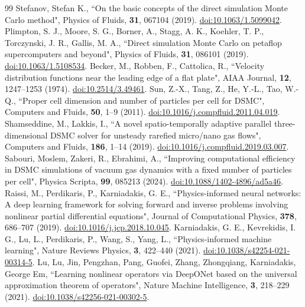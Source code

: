 \documentclass[aip,pof,preprint,notitlepage,floatfix,amsmath,amssymb]{revtex4-2}
\begin{document}
\begin{thebibliography}{99}
 Stefanov, Stefan K., ``On the basic concepts of the direct simulation Monte Carlo method", Physics of Fluids, \textbf{31}, 067104 (2019). \href{https://doi.org/10.1063/1.5099042}{doi:10.1063/1.5099042}.
 Plimpton, S. J., Moore, S. G., Borner, A., Stagg, A. K., Koehler, T. P., Torczynski, J. R., Gallis, M. A., ``Direct simulation Monte Carlo on petaflop supercomputers and beyond", Physics of Fluids, \textbf{31}, 086101 (2019). \href{https://doi.org/10.1063/1.5108534}{doi:10.1063/1.5108534}.
 Becker, M., Robben, F., Cattolica, R., ``Velocity distribution functions near the leading edge of a flat plate", AIAA Journal, \textbf{12}, 1247--1253 (1974). \href{https://doi.org/10.2514/3.49461}{doi:10.2514/3.49461}.
 Sun, Z.-X., Tang, Z., He, Y.-L., Tao, W.-Q., ``Proper cell dimension and number of particles per cell for DSMC", Computers and Fluids, \textbf{50}, 1--9 (2011). \href{https://doi.org/10.1016/j.compfluid.2011.04.019}{doi:10.1016/j.compfluid.2011.04.019}.
 Shamseddine, M., Lakkis, I., ``A novel spatio-temporally adaptive parallel three-dimensional DSMC solver for unsteady rarefied micro/nano gas flows", Computers and Fluids, \textbf{186}, 1--14 (2019). \href{https://doi.org/10.1016/j.compfluid.2019.03.007}{doi:10.1016/j.compfluid.2019.03.007}.
 Sabouri, Moslem, Zakeri, R., Ebrahimi, A., ``Improving computational efficiency in DSMC simulations of vacuum gas dynamics with a fixed number of particles per cell", Physica Scripta, \textbf{99}, 085213 (2024). \href{https://doi.org/10.1088/1402-4896/ad5a46}{doi:10.1088/1402-4896/ad5a46}.
 Raissi, M., Perdikaris, P., Karniadakis, G. E., ``Physics-informed neural networks: A deep learning framework for solving forward and inverse problems involving nonlinear partial differential equations", Journal of Computational Physics, \textbf{378}, 686--707 (2019). \href{https://doi.org/10.1016/j.jcp.2018.10.045}{doi:10.1016/j.jcp.2018.10.045}.
 Karniadakis, G. E., Kevrekidis, I. G., Lu, L., Perdikaris, P., Wang, S., Yang, L., ``Physics-informed machine learning", Nature Reviews Physics, \textbf{3}, 422--440 (2021). \href{https://doi.org/10.1038/s42254-021-00314-5}{doi:10.1038/s42254-021-00314-5}.
 Lu, Lu, Jin, Pengzhan, Pang, Guofei, Zhang, Zhongqiang, Karniadakis, George Em, ``Learning nonlinear operators via DeepONet based on the universal approximation theorem of operators", Nature Machine Intelligence, \textbf{3}, 218--229 (2021). \href{https://doi.org/10.1038/s42256-021-00302-5}{doi:10.1038/s42256-021-00302-5}.

\end{thebibliography}
\end{document}
